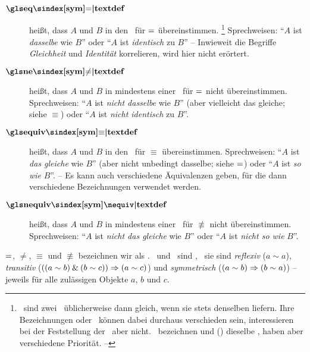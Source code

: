\begin{description}
	\item[$\definition{\symeq}$]  \label{def:Gleichheit}
	 heißt, dass $A$ und $B$ in den \interessierendenEigenschaften\ für $=$ übereinstimmen.%
	\footnote{%
		\textZB\ sind zwei \Junktoren\ üblicherweise dann gleich, wenn sie stets denselben \emph{\Wahrheitswert} liefern.
		Ihre Bezeichnungen oder \Symbole\ können dabei durchaus verschieden sein, interessieren bei der Feststellung der \Gleichheit\ aber nicht.
		\textZB\ bezeichnen \chrqt{\symmetaand} und \chrqt{\symsrand} () dieselbe \Operation, haben aber verschiedene Priorität. -- 
	}
	Sprechweisen: \enquote{$A$ ist \emph{dasselbe} wie $B$} oder \enquote{$A$ ist \emph{identisch} zu $B$}
	-- Inwieweit die Begriffe \emph{Gleichheit} und \emph{Identität} korrelieren, wird hier nicht erörtert.
	\item[$\definition{\symne}$]  \label{def:Ungleichheit}
	 heißt, dass $A$ und $B$ in mindestens einer \interessierendenEigenschaft\ für $=$ nicht übereinstimmen.
	Sprechweisen: \enquote{$A$ ist \emph{nicht dasselbe} wie $B$} (aber vielleicht das gleiche; siehe $\equiv$) oder \enquote{$A$ ist \emph{nicht identisch} zu $B$}.
	\item[$\definition{\symequiv}$]  \label{def:Aequivalenz}
	 heißt, dass $A$ und $B$ in den \interessierendenEigenschaften\ für $\equiv$ übereinstimmen.
	Sprechweisen: \enquote{$A$ ist \emph{das gleiche} wie $B$} (aber nicht unbedingt dasselbe; siehe $=$) oder \enquote{$A$ ist \emph{so wie} $B$}.
	-- Es kann auch verschiedene Äquivalenzen geben, für die dann verschiedene Bezeichnungen verwendet werden.
	\item[$\definition{\symnequiv}$]  \label{def:Kontravalenz}
	 heißt, dass $A$ und $B$ in mindestens einer \interessierendenEigenschaft\ für $\nequiv$ nicht übereinstimmen.
	Sprechweisen: \enquote{$A$ ist \emph{nicht das gleiche} wie $B$} oder \enquote{$A$ ist \emph{nicht so wie} $B$}.
\end{description}

$=$, $\ne$, $\equiv$ und $\nequiv$ bezeichnen wir als  .
\Gleichheit\ und \Aequivalenz\ sind , \textdh\ sie sind \emph{reflexiv} ($a \sim a$), \emph{transitiv} ($((a \sim b) \mathbin{\&} (b \sim c)) \Rightarrow (a \sim c)$) und \emph{symmetrisch} ($(a \sim b) \Rightarrow (b \sim a)$)
-- jeweils für alle zulässigen Objekte $a$, $b$ und $c$.

